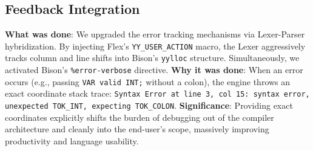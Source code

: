 \documentclass[12pt, a4paper]{article}
\begin{document}
\subsection{Feedback Integration}
\textbf{What was done}: We upgraded the error tracking mechanisms via Lexer-Parser hybridization. By injecting Flex's \texttt{YY\_USER\_ACTION} macro, the Lexer aggressively tracks column and line shifts into Bison's \texttt{yylloc} structure. Simultaneously, we activated Bison's \texttt{\%error-verbose} directive.
\newline
\textbf{Why it was done}: When an error occurs (e.g., passing \texttt{VAR valid INT;} without a colon), the engine throws an exact coordinate stack trace: \texttt{Syntax Error at line 3, col 15: syntax error, unexpected TOK\_INT, expecting TOK\_COLON}.
\newline
\textbf{Significance}: Providing exact coordinates explicitly shifts the burden of debugging out of the compiler architecture and cleanly into the end-user's scope, massively improving productivity and language usability.
\end{document}
